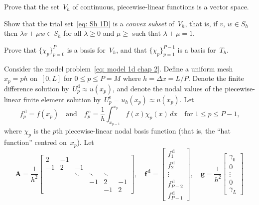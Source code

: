 \begin{Exercises}

\exercise\label{ex: V_h vector space}
Prove that the set~$V_h$ of continuous, piecewise-linear functions is a vector 
space.

\exercise
Show that the trial set~\eqref{eq: Sh 1D} is a \emph{convex subset} of~$V_h$,
that is, if $v$, $w\in S_h$ then $\lambda v+\mu w\in S_h$ for all $\lambda\ge0$
and $\mu\ge$ such that $\lambda+\mu=1$.

\exercise
Prove that $\{\chi_p\}_{p=0}^P$ is a basis for~$V_h$, and that 
$\{\chi_p\}_{p=1}^{P-1}$ is a basis for~$T_h$.

\exercise
Consider the model problem~\eqref{eq: model 1d chap 2}.  Define a uniform 
mesh~$x_p=ph$ on~$[0,L]$ for $0\le p\le P=M$ where $h=\Delta x=L/P$.  Denote 
the finite difference solution by~$U^{\mathrm{d}}_p\approx u(x_p)$, and denote 
the nodal values of the piecewise-linear finite element solution 
by~$U^{\mathrm{e}}_p=u_h(x_p)\approx u(x_p)$.  Let 
\[
f^{\,\mathrm{d}}_p=f(x_p)\quad\text{and}\quad
f^{\,\mathrm{e}}_p=\frac{1}{h}\int_{x_{p-1}}^{x_p}f(x)\chi_p(x)\,dx
\quad\text{for $1\le p\le P-1$,}
\]
where $\chi_p$ is the $p$th piecewise-linear nodal basis function (that is, the 
``hat function'' centred on~$x_p$).  Let
\[
\boldsymbol{A}=\frac{1}{h^2}\begin{bmatrix}
 2&-1&      &      &      &\\
-1& 2&    -1&      &      &\\
  &  &\ddots&\ddots&\ddots&\\
  &  &      &    -1&     2&-1\\
  &  &      &      &    -1& 2
\end{bmatrix},\quad
\boldsymbol{f}^{\,\mathrm{d}}=\begin{bmatrix}
f^{\,\mathrm{d}}_1\\                              
f^{\,\mathrm{d}}_2\\                              
\vdots\\
f^{\,\mathrm{d}}_{P-2}\\                              
f^{\,\mathrm{d}}_{P-1}                              
\end{bmatrix},\quad
\boldsymbol{g}=\frac{1}{h^2}\begin{bmatrix}
\gamma_0\\ 0\\ \vdots\\ 0\\ \gamma_L                            

\end{bmatrix}\]
\end{Exercises}
